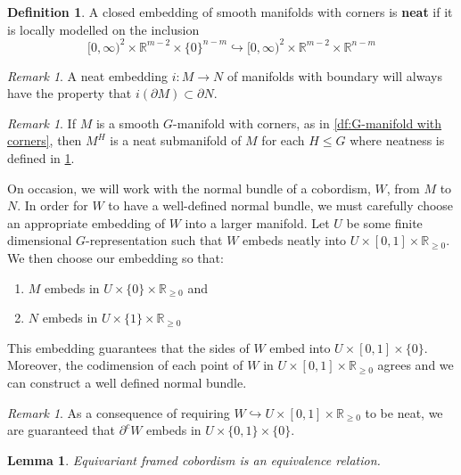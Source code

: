\documentclass[11pt]{amsart}
\newcommand{\R}{\mathbb R}
\theoremstyle{plain}   %
\newtheorem{lem}[thm]{Lemma}
\theoremstyle{definition}
\newtheorem{df}[thm]{Definition}
\theoremstyle{remark}
\newtheorem{rmk}[thm]{Remark}
\numberwithin{equation}{section}
\begin{document}
\begin{df}\label{df:neat}
A closed embedding of smooth manifolds with corners is \textbf{neat} if it is locally modelled on the inclusion
\[
[0,\infty)^2\times \R^{m-2}\times \{0\}^{n-m} \hookrightarrow [0,\infty)^2\times \R^{m-2}\times \R^{n-m}
\]
\end{df}

\begin{rmk}
A neat embedding $i:M\to N$ of manifolds with boundary will always have the property that $i(\partial M)\subset \partial N$. 
\end{rmk}

\begin{rmk}
If $M$ is a smooth $G$-manifold with corners, as in \cref{df:G-manifold with corners}, then $M^H$ is a neat submanifold of $M$ for each $H\leq G$ where neatness is defined in \cref{df:neat}.
\end{rmk}

On occasion, we will work with the normal bundle of a cobordism, $W$, from $M$ to $N$. In order for $W$ to have a well-defined normal bundle, we must carefully choose an appropriate embedding of $W$ into a larger manifold. Let $U$ be some finite dimensional $G$-representation such that $W$ embeds neatly into $U\times [0,1]\times \R_{\geq 0}$. We then choose our embedding so that:
\begin{enumerate}
\item $M$ embeds in $U\times \{0\}\times \R_{\geq 0}$ and
\item $N$ embeds in $U\times \{1\}\times \R_{\geq 0}$  
\end{enumerate}
This embedding guarantees that the sides of $W$ embed into $U\times[0,1]\times\{0\}$. Moreover, the codimension of each point of $W$ in $U\times[0,1]\times\R_{\geq 0}$ agrees and we can construct a well defined normal bundle. 

\begin{rmk}
As a consequence of requiring $W\hookrightarrow U\times [0,1]\times \R_{\geq 0}$ to be neat, we are guaranteed that $\partial^cW$ embeds in $U\times\{0,1\}\times \{0\}$.
\end{rmk}

\begin{lem}\label{lem:eq cobordism is eq rel}
Equivariant framed cobordism is an equivalence relation.
\end{lem}
\end{document}
